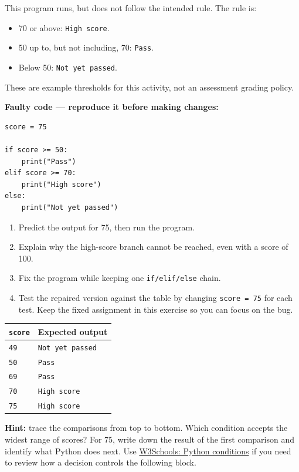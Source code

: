 \documentclass[12pt,a4paper]{article}
\begin{document}
This program runs, but does not follow the intended rule. The rule is:

\begin{itemize}
\item 70 or above: \texttt{High score}.
\item 50 up to, but not including, 70: \texttt{Pass}.
\item Below 50: \texttt{Not yet passed}.
\end{itemize}
These are example thresholds for this activity, not an assessment grading policy.

\textbf{Faulty code — reproduce it before making changes:}

\begin{minipage}{\linewidth}
\begin{lstlisting}
score = 75

if score >= 50:
    print("Pass")
elif score >= 70:
    print("High score")
else:
    print("Not yet passed")
\end{lstlisting}
\end{minipage}
\par
\begin{enumerate}
\item Predict the output for 75, then run the program.
\item Explain why the high-score branch cannot be reached, even with a score of 100.
\item Fix the program while keeping one \texttt{if/elif/else} chain.
\item Test the repaired version against the table by changing \texttt{score = 75} for each test. Keep the fixed assignment in this exercise so you can focus on the bug.
\end{enumerate}
\begingroup\small\renewcommand{\arraystretch}{1.3}\begin{longtable}{>{\raggedright\arraybackslash}p{}>{\raggedright\arraybackslash}p{}}
\toprule
\rowcolor{panel} \texttt{score} & Expected output \\ \midrule\endhead
\texttt{49} & \texttt{Not yet passed} \\
\texttt{50} & \texttt{Pass} \\
\texttt{69} & \texttt{Pass} \\
\texttt{70} & \texttt{High score} \\
\texttt{75} & \texttt{High score} \\
\bottomrule\end{longtable}\endgroup
\textbf{Hint:} trace the comparisons from top to bottom. Which condition accepts the widest range of scores? For 75, write down the result of the first comparison and identify what Python does next. Use \href{https://www.w3schools.com/python/python_conditions.asp}{W3Schools: Python conditions} if you need to review how a decision controls the following block.
\end{document}
